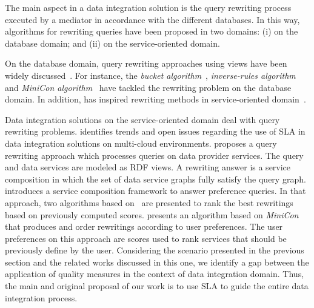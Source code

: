 The main aspect in a data integration solution is 
the query rewriting process executed by a mediator
in accordance with the different databases.
%
In this way, algorithms for rewriting queries have
been proposed in two domains: (i) on the database 
domain; and (ii) on the service-oriented domain.

On the database domain, query rewriting approaches using
views have been widely discussed~\cite{Halevy:2001}.
%
For instance, the \textit{bucket algorithm}~\cite{Levy:1996}, 
\textit{inverse-rules algorithm}~\cite{Duschka:1997} and 
\textit{MiniCon algorithm}~\cite{Pottinger:2001} have
tackled the rewriting problem on the database domain.
%
In addition, \cite{Pottinger:2001} has inspired rewriting methods in service-oriented domain~\cite{costa2013,ba2014}.

Data integration solutions on the 
service-oriented domain deal with query rewriting problems. \cite{Carvalho2015} identifies
trends and open issues regarding the use of SLA in data integration solutions on
multi-cloud environments.
%
\cite{Barhamgi2010} proposes a query rewriting approach 
which processes queries on data provider services.
The query and data services are modeled as RDF views.
A rewriting answer is a service composition in which 
the set of data service graphs fully satisfy the query graph.  
%
\cite{Benouaret2011} introduces a service composition
framework to answer preference queries. In that approach, two algorithms based
on~\cite{Barhamgi2010} are presented to rank the best rewritings based on previously computed scores.
%
\cite{ba2014} presents an algorithm based on \textit{MiniCon} 
that produces and order rewritings according to user preferences. 
The user preferences on this approach are scores used to rank 
services that should be previously define by the user. 
%
Considering the scenario presented in the previous section and the related works
discussed in this one, we identify a gap between the application of quality
measures in the context of data integration domain. Thus, the main
and original proposal of our work is to use SLA to guide the entire data integration process.

